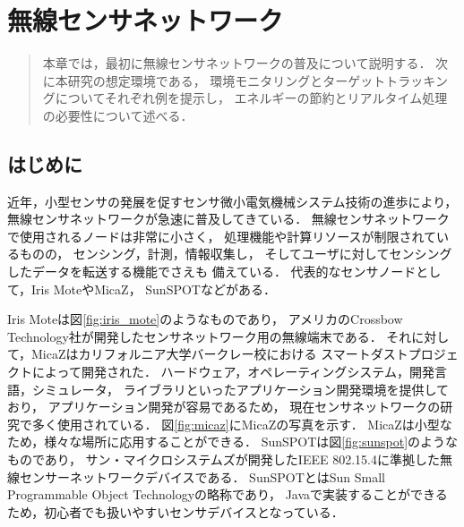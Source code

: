 \chapter{無線センサネットワーク}
\begin{large}
\begin{quote}
本章では，最初に無線センサネットワークの普及について説明する．
次に本研究の想定環境である，
環境モニタリングとターゲットトラッキングについてそれぞれ例を提示し，
エネルギーの節約とリアルタイム処理の必要性について述べる．
\end{quote}
\end{large}
\clearpage

\section{はじめに}
近年，小型センサの発展を促すセンサ微小電気機械システム技術の進歩により，
無線センサネットワークが急速に普及してきている．
無線センサネットワークで使用されるノードは非常に小さく，
処理機能や計算リソースが制限されているものの，
センシング，計測，情報収集し，
そしてユーザに対してセンシングしたデータを転送する機能でさえも
備えている．
代表的なセンサノードとして，Iris MoteやMicaZ\cite{Hill:2002:MWP:623308.624560}，
SunSPOTなどがある．

Iris Moteは図\ref{fig:iris_mote}のようなものであり，
アメリカのCrossbow Technology社が開発したセンサネットワーク用の無線端末である．
それに対して，MicaZはカリフォルニア大学バークレー校における
スマートダストプロジェクト\cite{Kahn:1999:NCC:313451.313558}によって開発された．
ハードウェア，オペレーティングシステム，開発言語，シミュレータ，
ライブラリといったアプリケーション開発環境を提供しており，
アプリケーション開発が容易であるため，
現在センサネットワークの研究で多く使用されている．
図\ref{fig:micaz}にMicaZの写真を示す．
MicaZは小型なため，様々な場所に応用することができる．
SunSPOTは図\ref{fig:sunspot}のようなものであり，
サン・マイクロシステムズが開発したIEEE 802.15.4に準拠した無線センサーネットワークデバイスである．
SunSPOTとはSun Small Programmable Object Technologyの略称であり，
Javaで実装することができるため，初心者でも扱いやすいセンサデバイスとなっている．


